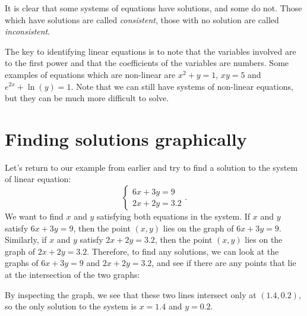 \documentclass[nooutcomes]{ximera}
\begin{document}
It is clear that some systems of equations have solutions, and some do not. Those which have solutions are called \emph{consistent}, those with no solution are called \emph{inconsistent}.

The key to identifying linear equations is to note that the variables involved are to the first power and that the coefficients of the variables are numbers. Some examples of equations which are non-linear are $x^2+y = 1$, $xy = 5$ and $e^{2x} + \ln(y) = 1$. Note that we can still have systems of non-linear equations, but they can be much more difficult to solve. 

\section{Finding solutions graphically}
Let's return to our example from earlier and try to find a solution to the system of linear equation:
$$
\begin{cases}
6x + 3y = 9 \\
2x + 2y = 3.2
\end{cases}.
$$
We want to find $x$ and $y$ satisfying both equations in the system. If $x$ and $y$ satisfy $6x + 3y = 9$, then the point $(x, y)$ lies on the graph of $6x + 3y = 9$. Similarly, if $x$ and $y$ satisfy $2x + 2y = 3.2$, then the point $(x, y)$ lies on the graph of $2x + 2y = 3.2$. Therefore, to find any solutions, we can look at the graphs of $6x + 3y = 9$ and $2x + 2y = 3.2$, and see if there are any points that lie at the intersection of the two graphs:

\begin{image}
\end{image}

By inspecting the graph, we see that these two lines intersect only at $(1.4, 0.2)$, so the only solution to the system is $x = 1.4$ and $y = 0.2$. 
\end{document}
